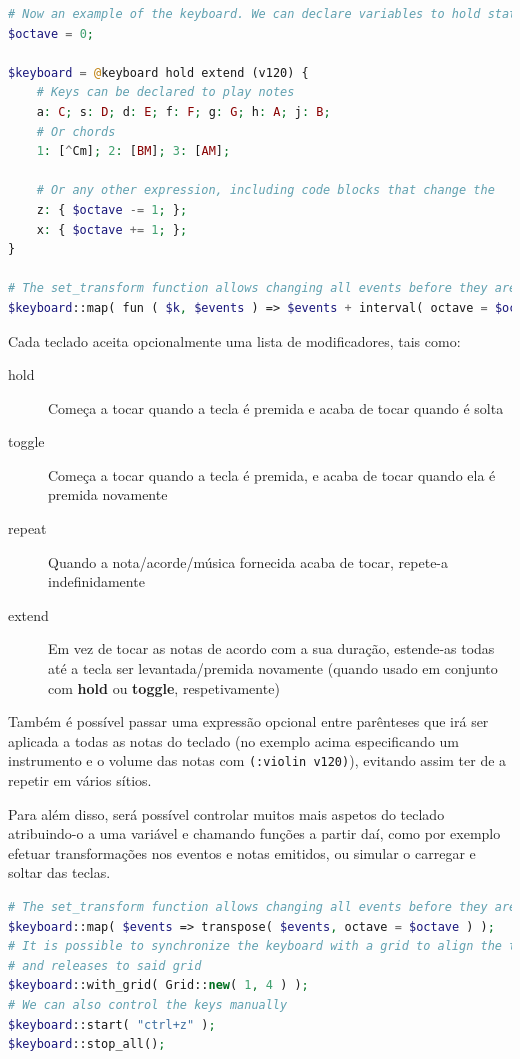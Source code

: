 \begin{lstlisting}[caption=Exemplo da sintaxe de teclados virtuais,language=PHP]
# Now an example of the keyboard. We can declare variables to hold state
$octave = 0;

$keyboard = @keyboard hold extend (v120) {
    # Keys can be declared to play notes
    a: C; s: D; d: E; f: F; g: G; h: A; j: B;
    # Or chords
    1: [^Cm]; 2: [BM]; 3: [AM];
    
    # Or any other expression, including code blocks that change the    state
    z: { $octave -= 1; };
    x: { $octave += 1; };
}

# The set_transform function allows changing all events before they are emitted by this keyboard
$keyboard::map( fun ( $k, $events ) => $events + interval( octave = $octave ) );
\end{lstlisting}

Cada\label{modifiers} teclado aceita opcionalmente uma lista de modificadores, tais como:
\begin{description}
    \item[hold] Começa a tocar quando a tecla é premida e acaba de tocar quando é solta
    \item[toggle] Começa a tocar quando a tecla é premida, e acaba de tocar quando ela é premida novamente
    \item[repeat] Quando a nota/acorde/música fornecida acaba de tocar, repete-a indefinidamente
    \item[extend] Em vez de tocar as notas de acordo com a sua duração, estende-as todas até a tecla ser levantada/premida novamente (quando usado em conjunto com \textbf{hold} ou \textbf{toggle}, respetivamente)
\end{description}

Também é possível passar uma expressão opcional entre parênteses que irá ser aplicada a todas as notas do teclado (no exemplo acima especificando um instrumento e o volume das notas com \texttt{(:violin v120)}), evitando assim ter de a repetir em vários sítios.

Para além disso, será possível controlar muitos mais aspetos do teclado atribuindo-o a uma variável e chamando funções a partir daí, como por exemplo efetuar transformações nos eventos e notas emitidos, ou simular o carregar e soltar das teclas.

\begin{lstlisting}[caption=Exemplo da sintaxe proposta da linguagem,language=PHP]
# The set_transform function allows changing all events before they are emitted by this keyboard
$keyboard::map( $events => transpose( $events, octave = $octave ) );
# It is possible to synchronize the keyboard with a grid to align the timings of key presses 
# and releases to said grid
$keyboard::with_grid( Grid::new( 1, 4 ) );
# We can also control the keys manually
$keyboard::start( "ctrl+z" );
$keyboard::stop_all();

\end{lstlisting}

